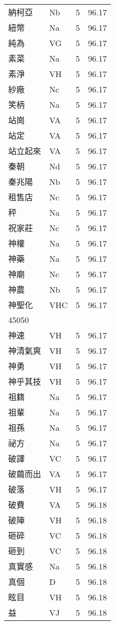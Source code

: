 \documentclass[twocolumn]{book}
\begin{document}
\begin{supertabular}{llrr}
納柯亞 & Nb & 5 &  96.17\\
紐幣 & Na & 5 &  96.17\\
純為 & VG & 5 &  96.17\\
素菜 & Na & 5 &  96.17\\
素淨 & VH & 5 &  96.17\\
紗廠 & Nc & 5 &  96.17\\
笑柄 & Na & 5 &  96.17\\
站崗 & VA & 5 &  96.17\\
站定 & VA & 5 &  96.17\\
站立起來 & VA & 5 &  96.17\\
秦朝 & Nd & 5 &  96.17\\
秦兆陽 & Nb & 5 &  96.17\\
租售店 & Nc & 5 &  96.17\\
秤 & Na & 5 &  96.17\\
祝家莊 & Nc & 5 &  96.17\\
神權 & Na & 5 &  96.17\\
神藥 & Na & 5 &  96.17\\
神廟 & Nc & 5 &  96.17\\
神農 & Nb & 5 &  96.17\\
神聖化 & VHC & 5 &  96.17\\
45050\\
神速 & VH & 5 &  96.17\\
神清氣爽 & VH & 5 &  96.17\\
神勇 & VH & 5 &  96.17\\
神乎其技 & VH & 5 &  96.17\\
祖籍 & Na & 5 &  96.17\\
祖輩 & Na & 5 &  96.17\\
祖孫 & Na & 5 &  96.17\\
祕方 & Na & 5 &  96.17\\
破譯 & VC & 5 &  96.17\\
破繭而出 & VA & 5 &  96.17\\
破落 & VH & 5 &  96.17\\
破費 & VA & 5 &  96.18\\
破陣 & VH & 5 &  96.18\\
砸碎 & VC & 5 &  96.18\\
砸到 & VC & 5 &  96.18\\
真實感 & Na & 5 &  96.18\\
真個 & D & 5 &  96.18\\
眩目 & VH & 5 &  96.18\\
益 & VJ & 5 &  96.18\\

\end{supertabular}
\end{document}
